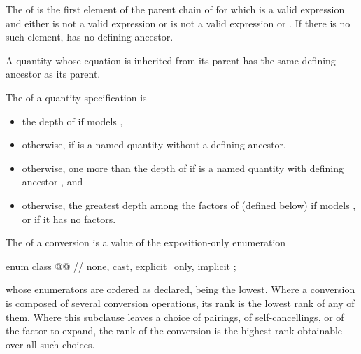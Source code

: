 \pnum
The  of  is
the first element  of the parent chain of 
for which  is a valid expression and
either  is not a valid expression or
 is not a valid expression or
.
If there is no such element,  has no defining ancestor.
\begin{note}
A quantity whose equation is inherited from its parent has the same defining ancestor as
its parent.
\end{note}

\pnum
The  of a quantity specification  is
\begin{itemize}
\item
the depth of  if  models ,
\item
otherwise,  if  is a named quantity without a defining ancestor,
\item
otherwise, one more than the depth of  if
 is a named quantity with defining ancestor , and
\item
otherwise, the greatest depth among the factors of  (defined below) if
 models , or
 if it has no factors.
\end{itemize}

\pnum
The  of a conversion is
a value of the exposition-only enumeration
\begin{codeblock}
enum class @@ {  // \expos
  none, cast, explicit_only, implicit
};
\end{codeblock}
whose enumerators are ordered as declared,  being the lowest.
Where a conversion is composed of several conversion operations, its rank is the lowest rank of any of them.
Where this subclause leaves a choice of pairings, of self-cancellings, or of the factor to expand,
the rank of the conversion is the highest rank obtainable over all such choices.

